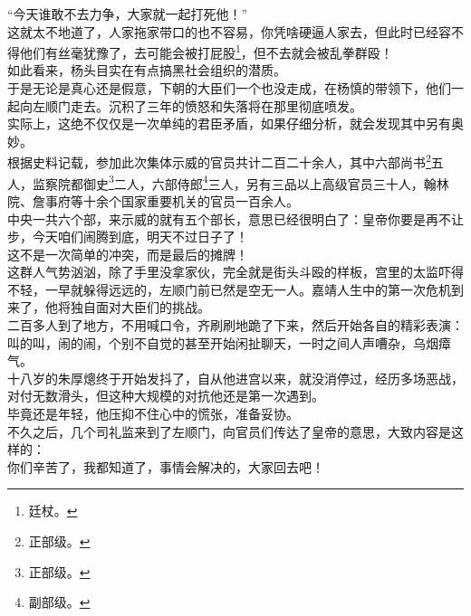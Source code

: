 \begin{multicols}{\theparacolNo}
“今天谁敢不去力争，大家就一起打死他！”\\

这就太不地道了，人家拖家带口的也不容易，你凭啥硬逼人家去，但此时已经容不得他们有丝毫犹豫了，去可能会被打屁股\footnote{廷杖。}，但不去就会被乱拳群殴！\\

如此看来，杨头目实在有点搞黑社会组织的潜质。\\

于是无论是真心还是假意，下朝的大臣们一个也没走成，在杨慎的带领下，他们一起向左顺门走去。沉积了三年的愤怒和失落将在那里彻底喷发。\\

实际上，这绝不仅仅是一次单纯的君臣矛盾，如果仔细分析，就会发现其中另有奥妙。\\

根据史料记载，参加此次集体示威的官员共计二百二十余人，其中六部尚书\footnote{正部级。}五人，监察院都御史\footnote{正部级。}二人，六部侍郎\footnote{副部级。}三人，另有三品以上高级官员三十人，翰林院、詹事府等十余个国家重要机关的官员一百余人。\\

中央一共六个部，来示威的就有五个部长，意思已经很明白了：皇帝你要是再不让步，今天咱们闹腾到底，明天不过日子了！\\

这不是一次简单的冲突，而是最后的摊牌！\\

这群人气势汹汹，除了手里没拿家伙，完全就是街头斗殴的样板，宫里的太监吓得不轻，一早就躲得远远的，左顺门前已然是空无一人。嘉靖人生中的第一次危机到来了，他将独自面对大臣们的挑战。\\

二百多人到了地方，不用喊口令，齐刷刷地跪了下来，然后开始各自的精彩表演：叫的叫，闹的闹，个别不自觉的甚至开始闲扯聊天，一时之间人声嘈杂，乌烟瘴气。\\

十八岁的朱厚熜终于开始发抖了，自从他进宫以来，就没消停过，经历多场恶战，对付无数滑头，但这种大规模的对抗他还是第一次遇到。\\

毕竟还是年轻，他压抑不住心中的慌张，准备妥协。\\

不久之后，几个司礼监来到了左顺门，向官员们传达了皇帝的意思，大致内容是这样的：\\

你们辛苦了，我都知道了，事情会解决的，大家回去吧！\\


\end{multicols}
